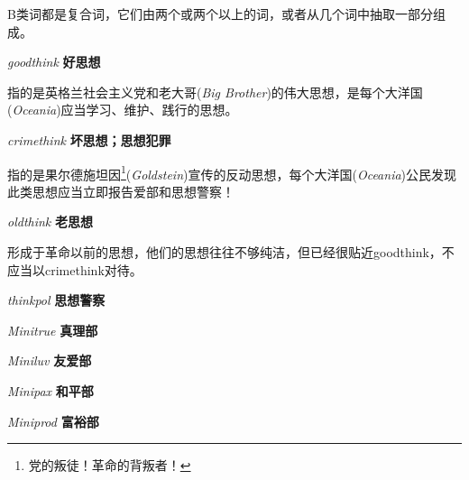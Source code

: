 \documentclass[lang=cn, color=black, chinesefont=founder]{elegantbook}
\newenvironment{word}[2]{
    \noindent \textit{#1} \quad \textbf{#2} \\
    \indent
}{}
\newcommand{\ingsoc}{英格兰社会主义党}
\newcommand{\bb}{老大哥(\textit{Big Brother})}
\newcommand{\oceania}{大洋国(\textit{Oceania})}
\newcommand{\gold}{果尔德施坦因\footnote{党的叛徒！革命的背叛者！}(\textit{Goldstein})}
\begin{document}
                B类词都是复合词，它们由两个或两个以上的词，或者从几个词中抽取一部分组成。

                \begin{multicols}{2}
                    \begin{word}{goodthink}{好思想}
                        指的是\ingsoc 和\bb 的伟大思想，是每个\oceania 应当学习、维护、践行的思想。
                    \end{word}
                    
                    \begin{word}{crimethink}{坏思想；思想犯罪}
                        指的是\gold 宣传的反动思想，每个\oceania 公民发现此类思想应当立即报告爱部和思想警察！
                    \end{word}

                    \begin{word}{oldthink}{老思想}
                        形成于革命以前的思想，他们的思想往往不够纯洁，但已经很贴近goodthink，不应当以crimethink对待。
                    \end{word}

                    \begin{word}{thinkpol}{思想警察}\end{word}

                    \begin{word}{Minitrue}{真理部}\end{word}

                    \begin{word}{Miniluv}{友爱部}\end{word}

                    \begin{word}{Minipax}{和平部}\end{word}

                    \begin{word}{Miniprod}{富裕部}\end{word}
                \end{multicols}
\end{document}
